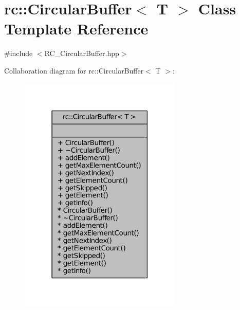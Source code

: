 \hypertarget{classrc_1_1CircularBuffer}{\section{rc\+:\+:Circular\+Buffer$<$ T $>$ Class Template Reference}
\label{classrc_1_1CircularBuffer}
}


{\ttfamily \#include $<$R\+C\+\_\+\+Circular\+Buffer.\+hpp$>$}



Collaboration diagram for rc\+:\+:Circular\+Buffer$<$ T $>$\+:\nopagebreak
\begin{figure}[H]
\begin{center}
\leavevmode
\includegraphics[width=219pt]{classrc_1_1CircularBuffer__coll__graph}
\end{center}
\end{figure}
